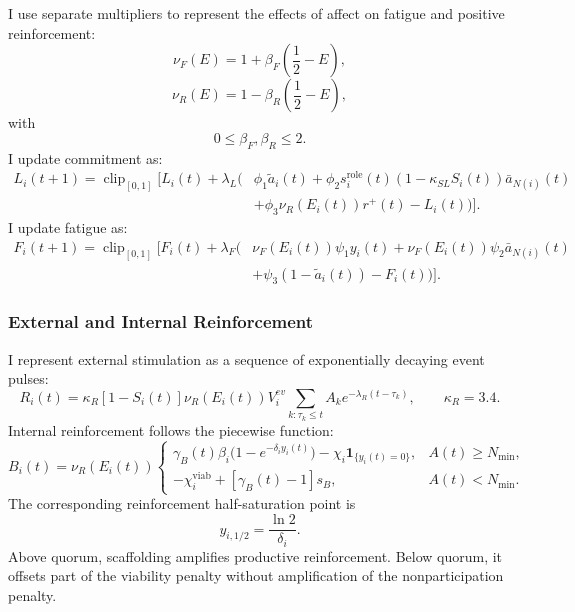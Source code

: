 \documentclass[11pt]{article}
\newcommand{\clip}{\operatorname{clip}_{[0,1]}}
\begin{document}
I use separate multipliers to represent the effects of affect on fatigue and positive reinforcement:
\[
\nu_F(E)=1+\beta_F(\frac{1}{2}-E),
\]
\[
\nu_R(E)=1-\beta_R(\frac{1}{2}-E),
\]
with
\[
0\le \beta_F, \beta_R \le 2.
\]
I update commitment as:
\begin{equation}\tag{5}\label{eq:loyalty}
\begin{aligned}
L_i(t{+}1)=\clip\!\Big[L_i(t)+\lambda_L\big(&\phi_1\tilde a_i(t)+\phi_2s_i^{\mathrm{role}}(t)(1-\kappa_{SL}S_i(t))\bar a_{N(i)}(t)\\
&+\phi_3\nu_R(E_i(t))r^+(t)-L_i(t)\big)\Big].
\end{aligned}
\end{equation}
I update fatigue as:
\begin{equation}\tag{6}\label{eq:fatigue}
\begin{aligned}
F_i(t{+}1)=\clip\!\Big[F_i(t)+\lambda_F\big(&\nu_F(E_i(t))\psi_1y_i(t)+\nu_F(E_i(t))\psi_2\bar a_{N(i)}(t)\\
&+\psi_3(1-\tilde a_i(t))-F_i(t)\big)\Big].
\end{aligned}
\end{equation}
\subsubsection{External and Internal Reinforcement}
I represent external stimulation as a sequence of exponentially decaying event pulses:
\[
R_i(t)=\kappa_R[1-S_i(t)]\nu_R(E_i(t))V_i^{ev}\sum_{k:\tau_k\le t}A_ke^{-\lambda_R(t-\tau_k)}, \qquad \kappa_R=3.4.
\tag{7}
\]
Internal reinforcement follows the piecewise function:
\begin{equation}\tag{8}\label{eq:internal}
B_i(t)=\nu_R(E_i(t))
\begin{cases}
\gamma_B(t)\beta_i\big(1-e^{-\delta_i y_i(t)}\big)-\chi_i\mathbf 1_{\{y_i(t)=0\}}, & A(t)\ge N_{\min},\\[3pt]
-\chi_i^{\mathrm{viab}}+[\gamma_B(t)-1]s_B, & A(t)<N_{\min}.
\end{cases}
\end{equation}
The corresponding reinforcement half-saturation point is
\[
y_{i,1/2}=\frac{\ln2}{\delta_i}.
\]
Above quorum, scaffolding amplifies productive reinforcement. Below quorum, it offsets part of the viability penalty without amplification of the nonparticipation penalty.
\end{document}
